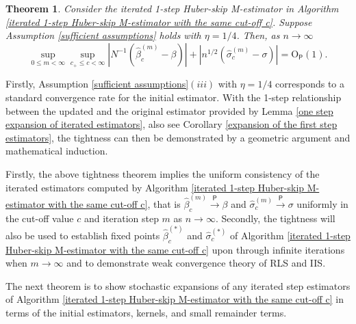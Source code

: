 \documentclass[11pt, letterpaper]{article}
\newtheorem{theorem}{Theorem}
\numberwithin{algorithm}{section}
\numberwithin{assumption}{section}
\numberwithin{lemma}{section}
\numberwithin{theorem}{section}
\numberwithin{corollary}{section}
\numberwithin{remark}{section}
\numberwithin{equation}{section}
\numberwithin{figure}{section}
\numberwithin{table}{section}
\begin{document}
\begin{theorem} \label{tightness of iterated estimators}
Consider the iterated 1-step Huber-skip M-estimator in Algorithm \ref{iterated 1-step Huber-skip M-estimator with the same cut-off c}. Suppose Assumption \ref{sufficient assumptions} holds with $\eta = 1/4$. Then, as $n \to \infty$
\begin{equation*}
\sup_{0 \le m < \infty} \sup_{c_{+} \le c < \infty} |N^{-1} (\widehat{\beta}_{c}^{(m)} - \beta)| + |n^{1/2} (\widehat{\sigma}_{c}^{(m)} - \sigma)| = \mathrm{O}_{\mathsf{P}}(1).
\end{equation*}
\end{theorem}

Firstly, Assumption \ref{sufficient assumptions}$(iii)$ with $\eta = 1/4$ corresponds to a standard convergence rate for the initial estimator. With the 1-step relationship between the updated and the original estimator provided by Lemma \ref{one step expansion of iterated estimators}, also see Corollary \ref{expansion of the first step estimators}, the tightness can then be demonstrated by a geometric argument and mathematical induction.

Firstly, the above tightness theorem implies the uniform consistency of the iterated estimators computed by Algorithm \ref{iterated 1-step Huber-skip M-estimator with the same cut-off c}, that is $\widehat{\beta}_{c}^{(m)} \overset{\mathsf{P}}{\to} \beta$ and $\widehat{\sigma}_{c}^{(m)} \overset{\mathsf{P}}{\to} \sigma$ uniformly in the cut-off value $c$ and iteration step $m$ as $n \to \infty$. Secondly, the tightness will also be used to establish fixed points $\widehat{\beta}_{c}^{(\ast)}$ and $\widehat{\sigma}_{c}^{(\ast)}$ of Algorithm \ref{iterated 1-step Huber-skip M-estimator with the same cut-off c} upon through infinite iterations when $m \to \infty$ and to demonstrate weak convergence theory of RLS and IIS.

The next theorem is to show stochastic expansions of any iterated step estimators of Algorithm \ref{iterated 1-step Huber-skip M-estimator with the same cut-off c} in terms of the initial estimators, kernels, and small remainder terms.
\end{document}
